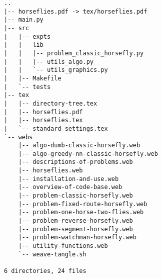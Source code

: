 \begin{verbatim}
..
|-- horseflies.pdf -> tex/horseflies.pdf
|-- main.py
|-- src
|   |-- expts
|   |-- lib
|   |   |-- problem_classic_horsefly.py
|   |   |-- utils_algo.py
|   |   `-- utils_graphics.py
|   |-- Makefile
|   `-- tests
|-- tex
|   |-- directory-tree.tex
|   |-- horseflies.pdf
|   |-- horseflies.tex
|   `-- standard_settings.tex
`-- webs
    |-- algo-dumb-classic-horsefly.web
    |-- algo-greedy-nn-classic-horsefly.web
    |-- descriptions-of-problems.web
    |-- horseflies.web
    |-- installation-and-use.web
    |-- overview-of-code-base.web
    |-- problem-classic-horsefly.web
    |-- problem-fixed-route-horsefly.web
    |-- problem-one-horse-two-flies.web
    |-- problem-reverse-horsefly.web
    |-- problem-segment-horsefly.web
    |-- problem-watchman-horsefly.web
    |-- utility-functions.web
    `-- weave-tangle.sh

6 directories, 24 files
\end{verbatim}
